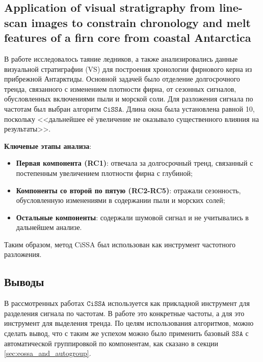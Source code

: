 \documentclass[12pt, specialist, subf
]{disser}
\theoremstyle{definition}
\newcommand{\SSA}{\texttt{SSA}}
\newcommand{\CISSA}{\texttt{CiSSA}}
\begin{document}
\subsection{Application of visual stratigraphy from line-scan images to constrain chronology and melt features of a firn core from coastal Antarctica}

В работе \cite{Dey_Thamban_Laluraj_Mahalinganathan_Redkar_Kumar_Matsuoka_2023} исследовалось таяние ледников, а также анализировались данные визуальной стратиграфии (VS) для построения хронологии фирнового керна из прибрежной Антарктиды. Основной задачей было отделение долгосрочного тренда, связанного с изменением плотности фирна, от сезонных сигналов, обусловленных включениями пыли и морской соли.
Для разложения сигнала по частотам был выбран алгоритм $\CISSA$. Длина окна была установлена равной 10, поскольку <<дальнейшее её увеличение не оказывало существенного влияния на результаты>>.

\noindent \textbf{Ключевые этапы анализа}:

\begin{itemize}
	\item \textbf{Первая компонента (RC1)}: отвечала за долгосрочный тренд, связанный с постепенным увеличением плотности фирна с глубиной;
	\item \textbf{Компоненты со второй по пятую (RC2-RC5)}: отражали сезонность, обусловленную изменениями в содержании пыли и морских солей;
	\item \textbf{Остальные компоненты}: содержали шумовой сигнал и не учитывались в дальнейшем анализе.
\end{itemize}

Таким образом, метод CiSSA был использован как инструмент частотного разложения.

\subsection{Выводы}

В рассмотренных работах $\CISSA$ используется как прикладной инструмент для разделения сигнала по частотам. В работе \cite{cognitive} это конкретные частоты, а для \cite{Dey_Thamban_Laluraj_Mahalinganathan_Redkar_Kumar_Matsuoka_2023} это инструмент для выделения тренда. По целям использования алгоритмов, можно сделать вывод, что с таким же успехом можно было применить базовый $\SSA$ с автоматической группировкой по компонентам, как сказано в секции \ref{sec:eossa_and_autogroup}.


\newpage
\end{document}
